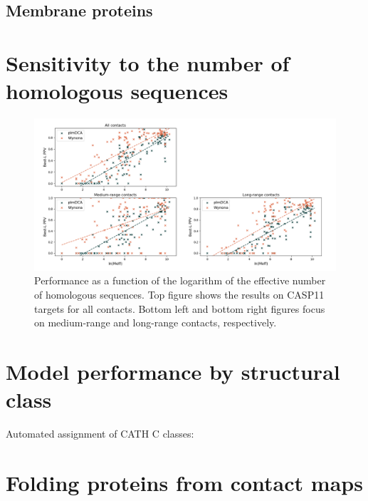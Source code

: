         \todo{}

    \subsection{Membrane proteins}

        \todo{}

\section{Sensitivity to the number of homologous sequences}

    \begin{figure}[H]
        \begin{center}
            \includegraphics[width=\textwidth, keepaspectratio]{imgs/Meff.png}
            \caption{Performance as a function of the logarithm of the effective
            number of homologous sequences. Top figure shows the results on
            CASP11 targets for all contacts. Bottom left and bottom right figures
            focus on medium-range and long-range contacts, respectively.}
            \label{sensitivity}
        \end{center}
    \end{figure}

\section{Model performance by structural class}

  Automated assignment of CATH C classes: 

\section{Folding proteins from contact maps}


